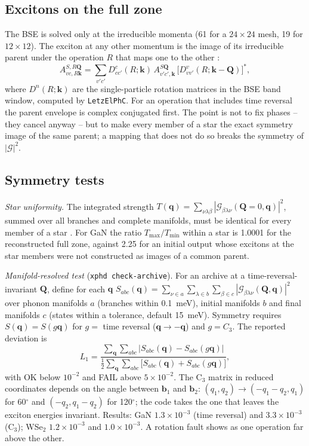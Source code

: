 \documentclass[10pt,a4paper]{article}
\newcommand{\G}{\mathcal{G}}
\newcommand{\bq}{\mathbf{q}}
\newcommand{\bQ}{\mathbf{Q}}
\newcommand{\bk}{\mathbf{k}}
\begin{document}
\subsection{Excitons on the full zone}
The BSE is solved only at the irreducible momenta (61 for a $24\times24$ mesh,
19 for $12\times12$). The exciton at any other momentum is the image of its
irreducible parent under the operation $R$ that maps one to the other
\cite{Nalabothula2026}:
\begin{equation}
A^{S,R\bQ}_{vc,R\bk}=\sum_{v'c'}D^{c}_{cc'}(R;\bk)\,A^{S\bQ}_{v'c',\bk}\,
\bigl[D^{v}_{vv'}(R;\bk-\bQ)\bigr]^{*},
\label{eq:rotate}
\end{equation}
where $D^{n}(R;\bk)$ are the single-particle rotation matrices in the BSE band
window, computed by \texttt{LetzElPhC}. For an operation that includes time
reversal the parent envelope is complex conjugated first. The point is not to
fix phases -- they cancel anyway -- but to make every member of a star the exact
symmetry image of the same parent; a mapping that does not do so breaks the
symmetry of $|\G|^2$.

\subsection{Symmetry tests}
\emph{Star uniformity.} The integrated strength
$T(\bq)=\sum_{\nu\lambda\beta}|\G_{\beta\lambda\nu}(\bQ=0,\bq)|^2$, summed over
all branches and complete manifolds, must be identical for every member of a
star \cite{Dresselhaus2008,BradleyCracknell1972,Maradudin1968}. For GaN the
ratio $T_{\max}/T_{\min}$ within a star is 1.0001 for the reconstructed full
zone, against 2.25 for an initial output whose excitons at the star members were
not constructed as images of a common parent.

\emph{Manifold-resolved test} (\texttt{xphd check-archive}). For an archive at a
time-reversal-invariant $\bQ$, define for each $\bq$
$S_{abc}(\bq)=\sum_{\nu\in a}\sum_{\lambda\in b}\sum_{\beta\in c}|\G_{\beta\lambda\nu}(\bQ,\bq)|^2$
over phonon manifolds $a$ (branches within 0.1~meV), initial manifolds $b$ and
final manifolds $c$ (states within a tolerance, default 15~meV). Symmetry
requires $S(\bq)=S(g\bq)$ for $g=$ time reversal ($\bq\to-\bq$) and $g=C_3$. The
reported deviation is
\begin{equation}
L_1=\frac{\sum_{\bq}\sum_{abc}|S_{abc}(\bq)-S_{abc}(g\bq)|}
{\tfrac12\sum_{\bq}\sum_{abc}\bigl[S_{abc}(\bq)+S_{abc}(g\bq)\bigr]} ,
\end{equation}
with OK below $10^{-2}$ and FAIL above $5\times10^{-2}$. The C$_3$ matrix in
reduced coordinates depends on the angle between $\mathbf{b}_1$ and
$\mathbf{b}_2$: $(q_1,q_2)\to(-q_1-q_2,q_1)$ for 60$^\circ$ and
$(-q_2,q_1-q_2)$ for 120$^\circ$; the code takes the one that leaves the exciton
energies invariant. Results: GaN $1.3\times10^{-3}$ (time reversal) and
$3.3\times10^{-3}$ (C$_3$); WSe$_2$ $1.2\times10^{-3}$ and $1.0\times10^{-3}$. A
rotation fault shows as one operation far above the other.
\end{document}
